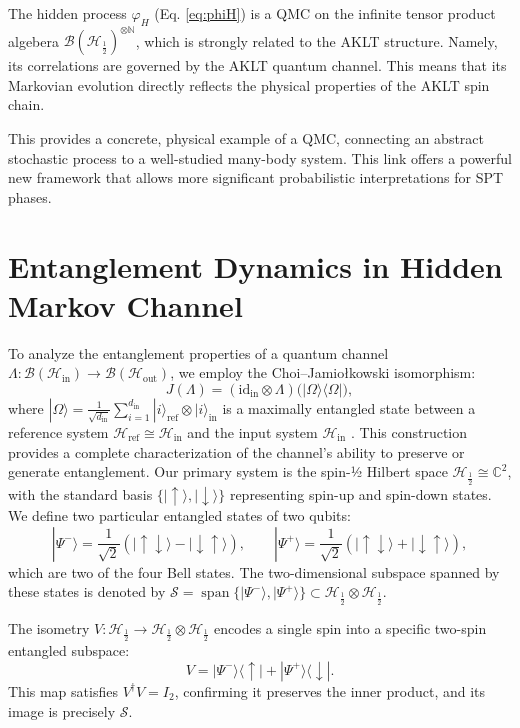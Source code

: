 \documentclass[12pt,a4paper]{article}
\begin{document}
The hidden process \(\varphi_H\) (Eq. \ref{eq:phiH}) is a  QMC  on  the infinite tensor product algebera $\mathcal{B}(\mathcal{H}_{\frac{1}{2}})^{\otimes \mathbb{N}}$, which is  strongly  related to the AKLT structure. Namely, its correlations are governed by the AKLT quantum channel. This means that its Markovian evolution directly reflects the physical properties of the AKLT spin chain.

This provides a concrete, physical example of a QMC, connecting an abstract stochastic process to a well-studied many-body system. This link offers a powerful new framework that allows more significant probabilistic interpretations for SPT phases.

\section{Entanglement Dynamics in Hidden Markov Channel}\label{Sect_HiddenEntang}


To analyze the entanglement properties of a quantum channel $\Lambda: \mathcal{B}(\mathcal{H}_{\text{in}}) \to \mathcal{B}(\mathcal{H}_{\text{out}})$, we employ the Choi–Jamiołkowski isomorphism:
\[
J(\Lambda) = (\mathrm{id}_{\text{in}} \otimes \Lambda)\bigl(|\Omega\rangle\langle\Omega|\bigr),
\]
where $|\Omega\rangle = \frac{1}{\sqrt{d_{\text{in}}}}\sum_{i=1}^{d_{\text{in}}} |i\rangle_{\text{ref}} \otimes |i\rangle_{\text{in}}$ is a maximally entangled state between a reference system $\mathcal{H}_{\text{ref}} \cong \mathcal{H}_{\text{in}}$ and the input system $\mathcal{H}_{\text{in}}$ \cite{FC2024}. This construction provides a complete characterization of the channel's ability to preserve or generate entanglement.
  Our primary system is the spin-½ Hilbert space $\mathcal{H}_{\frac12} \cong \mathbb{C}^2$, with the standard basis $\{|\uparrow\rangle, |\downarrow\rangle\}$ representing spin-up and spin-down states. We define two particular entangled states of two qubits:
\[
|\Psi^-\rangle = \frac{1}{\sqrt{2}}(|\uparrow\downarrow\rangle - |\downarrow\uparrow\rangle), \qquad
|\Psi^+\rangle = \frac{1}{\sqrt{2}}(|\uparrow\downarrow\rangle + |\downarrow\uparrow\rangle),
\]
which are two of the four Bell states. The two-dimensional subspace spanned by these states is denoted by $\mathcal{S} = \operatorname{span}\{|\Psi^-\rangle, |\Psi^+\rangle\} \subset \mathcal{H}_{\frac12} \otimes \mathcal{H}_{\frac12}$.



The isometry $V: \mathcal{H}_{\frac12} \to \mathcal{H}_{\frac12} \otimes \mathcal{H}_{\frac12}$ encodes a single spin into a specific two-spin entangled subspace:
\[
V = |\Psi^-\rangle\langle\uparrow| + |\Psi^+\rangle\langle\downarrow|.
\]
This map satisfies $V^\dagger V = I_2$, confirming it preserves the inner product, and its image is precisely $\mathcal{S}$.
\end{document}
